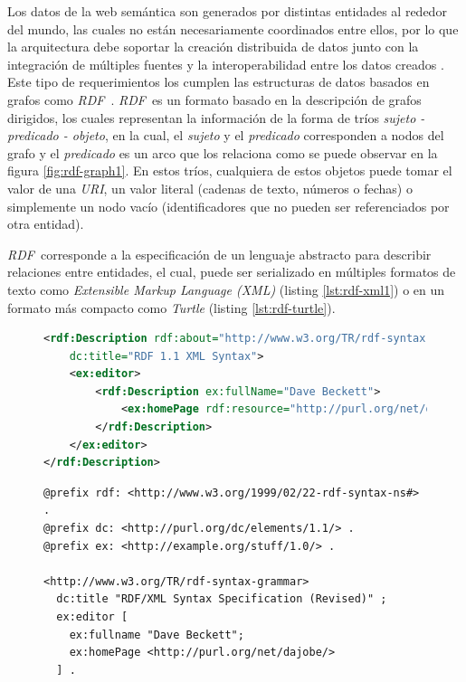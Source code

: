 \documentclass[conference,compsoc]{IEEEtran}
\newcommand{\rdf}{\textit{RDF}\ }
\begin{document}
Los datos de la web semántica son generados por distintas entidades al rededor del mundo, las cuales no están necesariamente
coordinados entre ellos, por lo que la arquitectura debe soportar la creación distribuida de datos junto con la integración
de múltiples fuentes y la interoperabilidad entre los datos creados \cite{bizer2011linked}. Este tipo de requerimientos los
cumplen las estructuras de datos basados en grafos como \rdf. \rdf es un formato basado en la descripción de grafos dirigidos,
los cuales representan la información de la forma de tríos \textit{sujeto - predicado - objeto}, en la cual, el \textit{sujeto} y el
\textit{predicado} corresponden a nodos del grafo y el \textit{predicado} es un arco que los relaciona como se puede observar
en la figura \ref{fig:rdf-graph1}. En estos tríos, cualquiera de estos objetos puede tomar el valor de una \textit{URI},
un valor literal (cadenas de texto, números o fechas) o simplemente un nodo vacío (identificadores que no pueden ser
referenciados por otra entidad).

\rdf corresponde a la especificación de un lenguaje abstracto para describir relaciones entre entidades, el cual, puede
ser serializado en múltiples formatos de texto como \textit{Extensible Markup Language (XML)} \cite{beckett2004rdf} (listing \ref{lst:rdf-xml1})
o en un formato más compacto como \textit{Turtle} \cite{beckett2014rdf} (listing \ref{lst:rdf-turtle}).

\begin{figure}
    \begin{lstlisting}[language=xml, captionpos=b, caption=Descripción de un documento en \textit{RDF/XML}, label=lst:rdf-xml1, basicstyle=\ttfamily, frame=single]
<rdf:Description rdf:about="http://www.w3.org/TR/rdf-syntax-grammar"
    dc:title="RDF 1.1 XML Syntax">
    <ex:editor>
        <rdf:Description ex:fullName="Dave Beckett">
            <ex:homePage rdf:resource="http://purl.org/net/dajobe/"/>
        </rdf:Description>
    </ex:editor>
</rdf:Description>
    \end{lstlisting}
\end{figure}

\begin{figure}
    \begin{lstlisting}[captionpos=b, caption=Descripción de un documento en \textit{RDF/Turtle}, label=lst:rdf-turtle, basicstyle=\ttfamily, frame=single]
@prefix rdf: <http://www.w3.org/1999/02/22-rdf-syntax-ns#> .
@prefix dc: <http://purl.org/dc/elements/1.1/> .
@prefix ex: <http://example.org/stuff/1.0/> .

<http://www.w3.org/TR/rdf-syntax-grammar>
  dc:title "RDF/XML Syntax Specification (Revised)" ;
  ex:editor [
    ex:fullname "Dave Beckett";
    ex:homePage <http://purl.org/net/dajobe/>
  ] .
    \end{lstlisting}
\end{figure}
\end{document}
